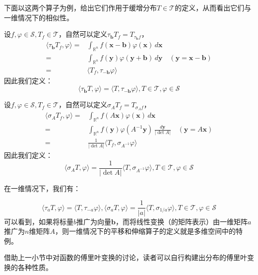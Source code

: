 下面以这两个算子为例，给出它们作用于缓增分布$T\in\mathcal{T} $的定义，从而看出它们与一维情况下的相似性。
\begin{example}[平移算子]
    设$f,\varphi\in\mathcal{S} ,T_f\in\mathcal{T} $，自然可以定义$\tau_{\mathbf{b}} T_f=T_{\tau_{\mathbf{b}} f}$，
    \begin{align*}
        \langle \tau_{\mathbf{b}} T_f,\varphi\rangle=&\int_{\mathbb{R}^n}f(\mathbf{x}-\mathbf{b})\varphi(\mathbf{x})\,d\mathbf{x}\\
        =&\int_{\mathbb{R}^n}f(\mathbf{y})\varphi(\mathbf{y}+\mathbf{b})\,d\mathbf{y}\quad (\mathbf{y}=\mathbf{x}-\mathbf{b})\\
        =&\langle T_f,\tau_{-\mathbf{b}}\varphi\rangle
    \end{align*}
    因此我们定义：
    \[\langle \tau_{\mathbf{b}} T,\varphi\rangle=\langle T,\tau_{-\mathbf{b}}\varphi\rangle,T\in\mathcal{T} ,\varphi\in\mathcal{S} \]
\end{example}

\begin{example}[伸缩算子]
    设$f,\varphi\in\mathcal{S} ,T_f\in\mathcal{T} $，自然可以定义$\sigma_A T_f=T_{\sigma_A f}$，
    \begin{align*}
        \langle \sigma_A T_f,\varphi\rangle=&\int_{\mathbb{R}^n}f(A\mathbf{x})\varphi(\mathbf{x})\,d\mathbf{x}\\
        =&\int_{\mathbb{R}^n}f(\mathbf{y})\varphi(A^{-1}\mathbf{y})\,\frac{d\mathbf{y}}{|\det A|}\quad (\mathbf{y}=A\mathbf{x})\\
        =&\frac{1}{|\det A|}\langle T_f,\sigma_{A^{-1}}\varphi\rangle
    \end{align*}
    因此我们定义：
    \[\langle \sigma_A T,\varphi\rangle=\frac{1}{|\det A|}\langle T,\sigma_{A^{-1}}\varphi\rangle,T\in\mathcal{T} ,\varphi\in\mathcal{S} \]
\end{example}
在一维情况下，我们有：

\[\langle \tau_a T,\varphi\rangle=\langle T,\tau_{-a}\varphi\rangle,\langle\sigma_{a} T,\varphi\rangle=\frac{1}{|a|}\langle T,\sigma_{1/a}\varphi\rangle,T\in\mathcal{T} ,\varphi\in\mathcal{S} \]
可以看到，如果将标量$b$推广为向量$\mathbf{b}$，而将线性变换（的矩阵表示）由一维矩阵$a$推广为$n$维矩阵$A$，则一维情况下的平移和伸缩算子的定义就是多维空间中的特例。

借助上一小节中对函数的傅里叶变换的讨论，读者可以自行构建出分布的傅里叶变换的各种性质。


